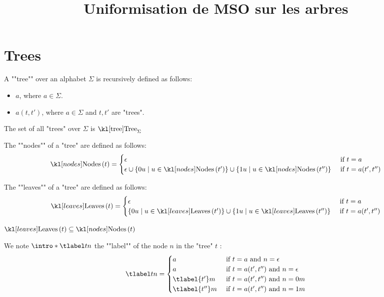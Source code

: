 \documentclass{article}
\begin{document}
\title{Uniformisation de MSO sur les arbres}

\maketitle

\section{Trees}


\begin{definition}[Tree]
	A ""tree"" over an alphabet $\Sigma$ is recursively defined as follows:
	\begin{itemize}
		\item $a$, where $a \in \Sigma$.
		\item $a(t,t')$, where $a \in \Sigma$ and $t, t'$ are "trees".
	\end{itemize}

	The set of all "trees" over $\Sigma$ is $\tree_{\Sigma}$
\end{definition}

\begin{definition}[Nodes]
	The ""nodes"" of a "tree" are defined as follows:
	\[
		\nodes t = \begin{cases}
			\epsilon                                & \text{ if } t = a         \\
			\epsilon \cup \setdef {0u} {u \in \nodes {t'}}
			\cup \setdef {1u} {u \in \nodes {t''} } & \text{ if } t = a(t',t'')
		\end{cases}
	\]
\end{definition}


\begin{definition}[Leaves]
	The ""leaves"" of a "tree" are defined as follows:
	\[
		\leaves t = \begin{cases}
			\epsilon                                 & \text{ if } t = a         \\
			\setdef {0u} {u \in \leaves {t'}}
			\cup \setdef {1u} {u \in \leaves {t''} } & \text{ if } t = a(t',t'')
		\end{cases}
	\]
\end{definition}

\begin{remark}
	$\leaves t \subseteq \nodes t$
\end{remark}

\begin{definition}
	We note $\intro* \tlabel t n$ the ""label"" of the node $n$ in the "tree" $t$ :
	\[
		\tlabel t n =   \begin{cases}
			a               & \text{ if } t = a \text{ and } n = \epsilon         \\
			a               & \text{ if } t = a(t',t'') \text{ and } n = \epsilon \\
			\tlabel {t'} m  & \text{ if } t = a(t',t'') \text{ and } n = 0m       \\
			\tlabel {t''} m & \text{ if } t = a(t',t'') \text{ and } n = 1m
		\end{cases}
	\]
\end{definition}
\end{document}

